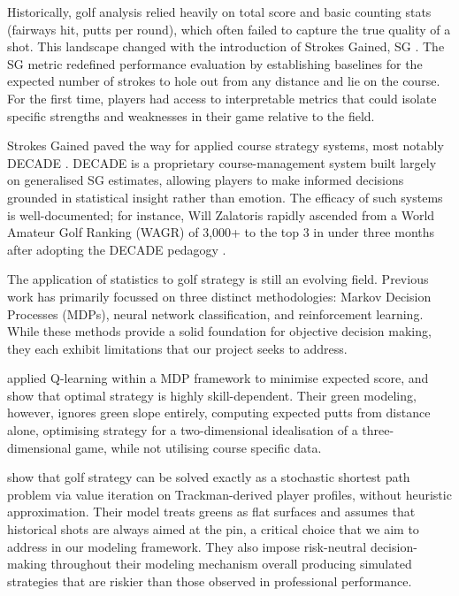 \documentclass[11pt, letterpaper]{article}
\begin{document}
Historically, golf analysis relied heavily on total score and basic counting stats (fairways hit, putts per round), which often failed to capture the true quality of a shot. This landscape changed with the introduction of Strokes Gained, SG \parencite{Broadie_2014a}. The SG metric redefined performance evaluation by establishing baselines for the expected number of strokes to hole out from any distance and lie on the course. For the first time, players had access to interpretable metrics that could isolate specific strengths and weaknesses in their game relative to the field.

Strokes Gained paved the way for applied course strategy systems, most notably DECADE \parencite{decade_golf}. DECADE is a proprietary course-management system built largely on generalised SG estimates, allowing players to make informed decisions grounded in statistical insight rather than emotion. The efficacy of such systems is well-documented; for instance, Will Zalatoris rapidly ascended from a World Amateur Golf Ranking (WAGR) of 3,000+ to the top 3 in under three months after adopting the DECADE pedagogy \parencite{decade_golf}.

The application of statistics to golf strategy is still an evolving field. Previous work has primarily focussed on three distinct methodologies: Markov Decision Processes (MDPs), neural network classification, and reinforcement learning. While these methods provide a solid foundation for objective decision making, they each exhibit limitations that our project seeks to address.


\textcite{sugawara_skill-based_2013} applied Q-learning within a MDP framework to minimise expected score, and show that optimal strategy is highly skill-dependent. Their green modeling, however, ignores green slope entirely, computing expected putts from distance alone, optimising strategy for a two-dimensional idealisation of a three-dimensional game, while not utilising course specific data. 

\textcite{stauffer_golf_2025} show that golf strategy can be solved exactly as a stochastic shortest path problem via value iteration on Trackman-derived player profiles, without heuristic approximation. Their model treats greens as flat surfaces and assumes that historical shots are always aimed at the pin, a critical choice that we aim to address in our modeling framework. They also impose risk-neutral decision-making throughout their modeling mechanism overall producing simulated strategies that are riskier than those observed in professional performance. 
\end{document}
